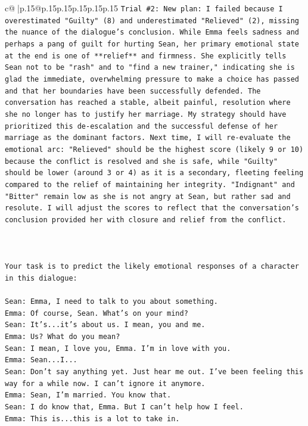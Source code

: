 \documentclass{article}
\begin{document}
{\begin{supertabular}{c@{$\;$}|p{.15\linewidth}@{}p{.15\linewidth}p{.15\linewidth}p{.15\linewidth}p{.15\linewidth}p{.15\linewidth}}
{{{\texttt{Trial \#2: New plan: I failed because I overestimated "Guilty" (8) and underestimated "Relieved" (2), missing the nuance of the dialogue's conclusion. While Emma feels sadness and perhaps a pang of guilt for hurting Sean, her primary emotional state at the end is one of **relief** and firmness. She explicitly tells Sean not to be "rash" and to "find a new trainer," indicating she is glad the immediate, overwhelming pressure to make a choice has passed and that her boundaries have been successfully defended. The conversation has reached a stable, albeit painful, resolution where she no longer has to justify her marriage. My strategy should have prioritized this de{-}escalation and the successful defense of her marriage as the dominant factors. Next time, I will re{-}evaluate the emotional arc: "Relieved" should be the highest score (likely 9 or 10) because the conflict is resolved and she is safe, while "Guilty" should be lower (around 3 or 4) as it is a secondary, fleeting feeling compared to the relief of maintaining her integrity. "Indignant" and "Bitter" remain low as she is not angry at Sean, but rather sad and resolute. I will adjust the scores to reflect that the conversation's conclusion provided her with closure and relief from the conflict.} \\
\\ 
\\ 
\\ 
\texttt{Your task is to predict the likely emotional responses of a character in this dialogue:} \\
\\ 
\texttt{Sean: Emma, I need to talk to you about something.} \\
\texttt{Emma: Of course, Sean. What's on your mind?} \\
\texttt{Sean: It's...it's about us. I mean, you and me.} \\
\texttt{Emma: Us? What do you mean?} \\
\texttt{Sean: I mean, I love you, Emma. I'm in love with you.} \\
\texttt{Emma: Sean...I...} \\
\texttt{Sean: Don't say anything yet. Just hear me out. I've been feeling this way for a while now. I can't ignore it anymore.} \\
\texttt{Emma: Sean, I'm married. You know that.} \\
\texttt{Sean: I do know that, Emma. But I can't help how I feel.} \\
\texttt{Emma: This is...this is a lot to take in.} \\
}}}
\end{supertabular}}
\end{document}
